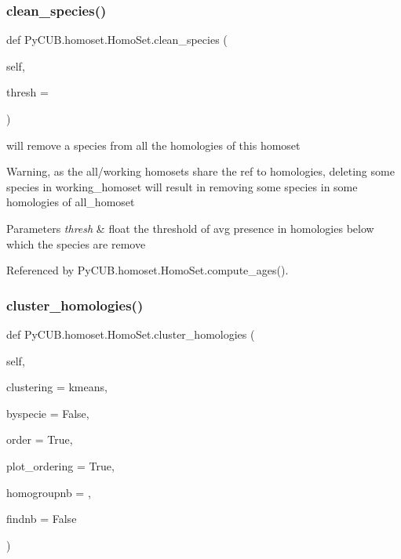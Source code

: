 \subsubsection{\texorpdfstring{clean\+\_\+species()}{clean\_species()}}
{\footnotesize\ttfamily def Py\+C\+U\+B.\+homoset.\+Homo\+Set.\+clean\+\_\+species (\begin{DoxyParamCaption}\item[{}]{self,  }\item[{}]{thresh = {} }\end{DoxyParamCaption})}



will remove a species from all the homologies of this homoset 

Warning, as the all/working homosets share the ref to homologies, deleting some species in working\+\_\+homoset will result in removing some species in some homologies of all\+\_\+homoset


\begin{DoxyParams}{Parameters}
{\em thresh} & float the threshold of avg presence in homologies below which the species are remove \\
\hline
\end{DoxyParams}


Referenced by Py\+C\+U\+B.\+homoset.\+Homo\+Set.\+compute\+\_\+ages().

\mbox{\label{class_py_c_u_b_1_1homoset_1_1_homo_set_a2d543ce742d6a4e968e14b1471319287}} 
\subsubsection{\texorpdfstring{cluster\+\_\+homologies()}{cluster\_homologies()}}
{\footnotesize\ttfamily def Py\+C\+U\+B.\+homoset.\+Homo\+Set.\+cluster\+\_\+homologies (\begin{DoxyParamCaption}\item[{}]{self,  }\item[{}]{clustering = {\ttfamily \textquotesingle{}kmeans\textquotesingle{}},  }\item[{}]{byspecie = {\ttfamily False},  }\item[{}]{order = {\ttfamily True},  }\item[{}]{plot\+\_\+ordering = {\ttfamily True},  }\item[{}]{homogroupnb = {},  }\item[{}]{findnb = {\ttfamily False} }\end{DoxyParamCaption})}



